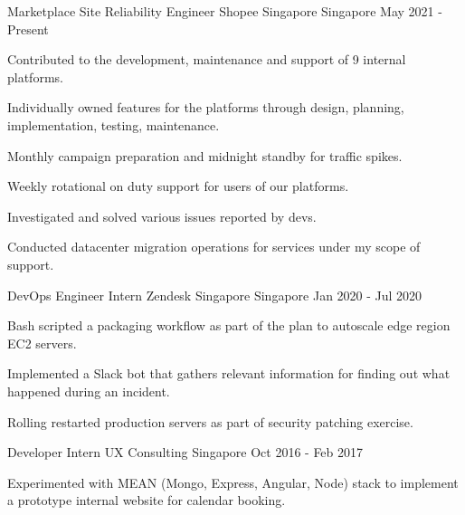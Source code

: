 

\begin{cventries}

  \cventry
    {Marketplace Site Reliability Engineer} %
    {Shopee Singapore} %
    {Singapore} %
    {May 2021 - Present} %
    {
      \begin{cvitems} %
        \item {Contributed to the development, maintenance and support of 9 internal platforms.}
        \item {Individually owned features for the platforms through design, planning, implementation, testing, maintenance.}
        \item {Monthly campaign preparation and midnight standby for traffic spikes.}
        \item {Weekly rotational on duty support for users of our platforms.}
        \item {Investigated and solved various issues reported by devs.}
        \item {Conducted datacenter migration operations for services under my scope of support.}
      \end{cvitems}
    }

  \cventry
    {DevOps Engineer Intern} %
    {Zendesk Singapore} %
    {Singapore} %
    {Jan 2020 - Jul 2020} %
    {
      \begin{cvitems} %
        \item {Bash scripted a packaging workflow as part of the plan to autoscale edge region EC2 servers.}
        \item {Implemented a Slack bot that gathers relevant information for finding out what happened during an incident.}
        \item {Rolling restarted production servers as part of security patching exercise.}
      \end{cvitems}
    }

  \cventry
    {Developer Intern} %
    {UX Consulting} %
    {Singapore} %
    {Oct 2016 - Feb 2017} %
    {
      \begin{cvitems} %
        \item {Experimented with MEAN (Mongo, Express, Angular, Node) stack to implement a prototype internal website for calendar booking.}
      \end{cvitems}
    }

\end{cventries}
